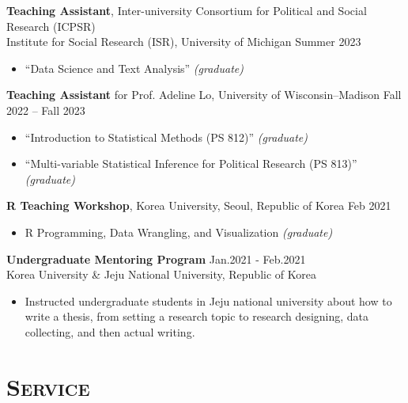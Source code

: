 \documentclass[11pt, letterpaper]{article}
\begin{document}
\vspace{-2mm}
\textbf{Teaching Assistant}, Inter-university Consortium for Political and Social Research (ICPSR)\\
Institute for Social Research (ISR), University of Michigan \hfill Summer 2023
\vspace{-2mm}
\begin{itemize}
    \item ``Data Science and Text Analysis'' \textit{(graduate)}
\end{itemize}

\vspace{-1mm}
\textbf{Teaching Assistant} for Prof. Adeline Lo, University of Wisconsin--Madison \hfill Fall 2022 -- Fall 2023\\
\vspace{-6mm}
\begin{itemize}
    \item ``Introduction to Statistical Methods (PS 812)'' \textit{(graduate)}
    \vspace{-3mm}
    \item ``Multi-variable Statistical Inference for Political Research (PS 813)'' \textit{(graduate)}
\end{itemize}

\vspace{-1mm}
\textbf{R Teaching Workshop}, Korea University, Seoul, Republic of Korea \hfill Feb 2021\\
\vspace{-7mm}
\begin{itemize}
    \setlength\itemsep{-.3em}
    \item R Programming, Data Wrangling, and Visualization \textit{(graduate)}
\end{itemize}

\vspace{-2mm}
\textbf{Undergraduate Mentoring Program} \hfill Jan.2021 - Feb.2021 \\
Korea University \& Jeju National University, Republic of Korea
\vspace{-2mm}
\begin{itemize}
\setlength\itemsep{-.3em}
\item Instructed undergraduate students in Jeju national university about how to write a thesis, from setting a research topic to research designing, data collecting, and then actual writing. 
\end{itemize}


\section*{\textsc{Service}}
\end{document}
